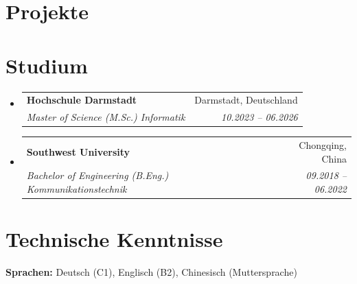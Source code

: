\documentclass[a4paper,11pt]{article}
\makeatletter
\newcommand{\resumeSubheading}[4]{
  \vspace{-2pt}\item
  \begin{tabular*}{0.97\textwidth}[t]{l@{\extracolsep{\fill}}r}
    \textbf{#1} & #2 \\
    \textit{\small#3} & \textit{\small #4} \\
  \end{tabular*}\vspace{-7pt}
}
\newcommand{\resumeSubHeadingListStart}{\begin{itemize}[leftmargin=0.15in,label={}]}
\newcommand{\resumeSubHeadingListEnd}{\end{itemize}}
\makeatother
\begin{document}
\section{Projekte}
\resumeSubHeadingListStart
\resumeSubHeadingListEnd

\section{Studium}
\resumeSubHeadingListStart
  \resumeSubheading
    {Hochschule Darmstadt}{Darmstadt, Deutschland}
    {Master of Science (M.Sc.) Informatik}{10.2023 -- 06.2026}
  \resumeSubheading
    {Southwest University}{Chongqing, China}
    {Bachelor of Engineering (B.Eng.) Kommunikationstechnik}{09.2018 -- 06.2022}
\resumeSubHeadingListEnd

\section{Technische Kenntnisse}
\begin{itemize}[leftmargin=0.15in,label={}]
  \small{\item{
    \textbf{Sprachen:} Deutsch (C1), Englisch (B2), Chinesisch (Muttersprache)
  }}
\end{itemize}
\end{document}
